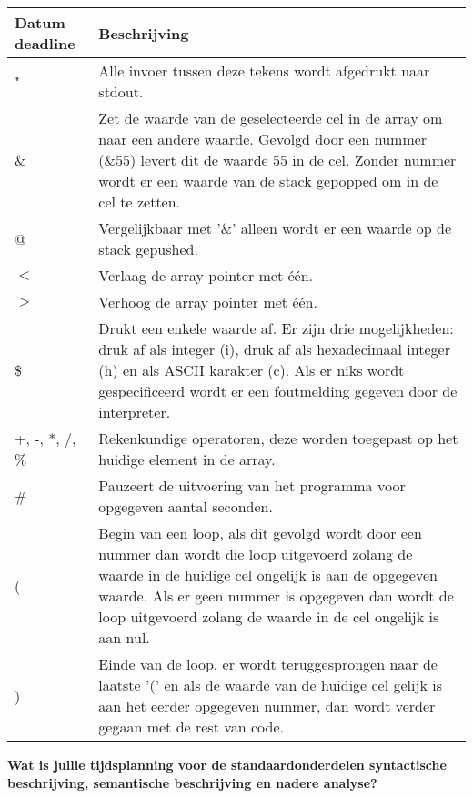 \documentclass[11pt]{article}
\begin{document}
\begin{center}
    \begin{tabular}{ | l | p{15cm} |}
    \hline
    Datum deadline & Beschrijving \\ \hline
    " & Alle invoer tussen deze tekens wordt afgedrukt naar stdout. \\ \hline
    \& & Zet de waarde van de geselecteerde cel in de array om naar een andere waarde. Gevolgd door een nummer (\&55) levert dit de waarde 55 in de cel. Zonder nummer wordt er een waarde van de stack gepopped om in de cel te zetten. \\ \hline
    @ & Vergelijkbaar met '\&' alleen wordt er een waarde op de stack gepushed. \\ \hline
    \(<\) & Verlaag de array pointer met \'e\'en. \\ \hline
    \(>\) & Verhoog de array pointer met \'e\'en. \\ \hline
    \$ & Drukt een enkele waarde af. Er zijn drie mogelijkheden: druk af als integer (i), druk af als hexadecimaal integer (h) en als ASCII karakter (c). Als er niks wordt gespecificeerd wordt er een foutmelding gegeven door de interpreter. \\ \hline
    +, -, *, /, \% & Rekenkundige operatoren, deze worden toegepast op het huidige element in de array. \\ \hline
    \# & Pauzeert de uitvoering van het programma voor opgegeven aantal seconden. \\ \hline
    ( & Begin van een loop, als dit gevolgd wordt door een nummer dan wordt die loop uitgevoerd zolang de waarde in de huidige cel ongelijk is aan de opgegeven waarde. Als er geen nummer is opgegeven dan wordt de loop uitgevoerd zolang de waarde in de cel ongelijk is aan nul. \\ \hline
    ) & Einde van de loop, er wordt teruggesprongen naar de laatste '(' en als de waarde van de huidige cel gelijk is aan het eerder opgegeven nummer, dan wordt verder gegaan met de rest van code. \\ \hline
  

    \hline
    \end{tabular}
\end{center}

{\bf
Wat is jullie tijdsplanning voor de standaardonderdelen syntactische beschrijving, semantische beschrijving en nadere analyse?
}

%
\end{document}
